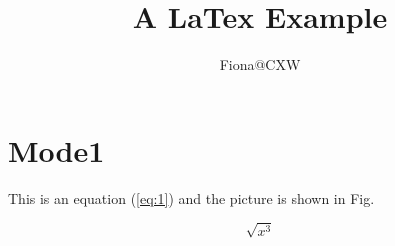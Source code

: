 \documentclass{article}
\title{A LaTex Example}
\author{Fiona@CXW}
\begin{document}
\maketitle
\zhlipsum[3][name=zhufu]
\section{Mode1}
This is an equation (\ref{eq:1}) and the picture is shown in Fig.

$$ \sqrt{x^3} $$
\end{document}
